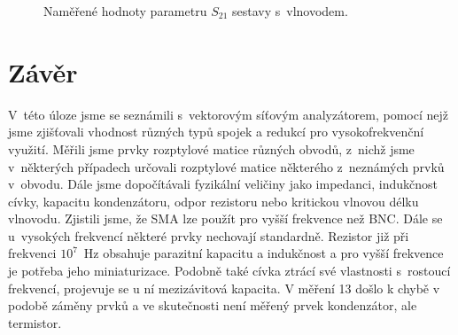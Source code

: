 \documentclass{protokol}
\newcommand\sparam{S}
\begin{document}
\begin{figure}[htbp]
	\centering
	
	\caption{Naměřené hodnoty parametru $\sparam_{21}$ sestavy s~vlnovodem.}
	\label{fig:17-sparam21}
\end{figure}

\newpage
\section{Závěr}
V~této úloze jsme se seznámili s~vektorovým síťovým analyzátorem, pomocí nejž
jsme zjišťovali vhodnost různých typů spojek a redukcí pro vysokofrekvenční
využití. Měřili jsme prvky rozptylové matice různých obvodů, z~nichž jsme
v~některých případech určovali rozptylové matice některého z~neznámých prvků
v~obvodu. Dále jsme dopočítávali fyzikální veličiny jako impedanci, indukčnost
cívky, kapacitu kondenzátoru, odpor rezistoru nebo kritickou vlnovou délku
vlnovodu.
Zjistili jsme, že SMA lze použít pro vyšší frekvence než BNC. Dále se
u~vysokých frekvencí některé prvky nechovají standardně. Rezistor již při
frekvenci $10^7$~Hz obsahuje parazitní kapacitu a indukčnost a pro
vyšší frekvence je potřeba jeho miniaturizace. Podobně také cívka ztrácí své vlastnosti s~rostoucí
frekvencí, projevuje se u ní mezizávitová kapacita. V měření 13 došlo k chybě v podobě záměny prvků a ve skutečnosti není měřený prvek kondenzátor, ale termistor.

\newpage
\printbibliography
\end{document}
